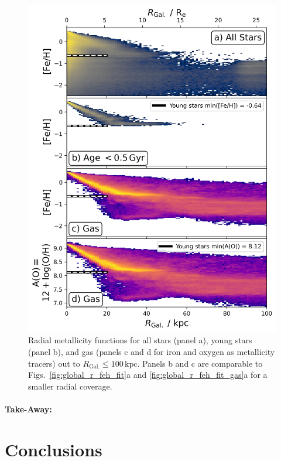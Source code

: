 \documentclass[fleqn,usenatbib]{mnras}
\begin{document}
\begin{figure}
    \centering
    \includegraphics[width=\columnwidth]{figures/trace_stars_and_gas_100kpc.png}
    \caption{Radial metallicity functions for all stars (panel a), young stars (panel b), and gas (panels c and d for iron and oxygen as metallicity tracers) out to $R_\mathrm{Gal.} \leq 100\,\mathrm{kpc}$. Panels b and c are comparable to Figs.~\ref{fig:global_r_feh_fit}a and \ref{fig:global_r_feh_fit_gas}a for a smaller radial coverage.}
    \label{fig:trace_stars_and_gas_100kpc}
\end{figure}

\paragraph*{Take-Away:} 

\section{Conclusions}
\label{sec:conc}
\end{document}
